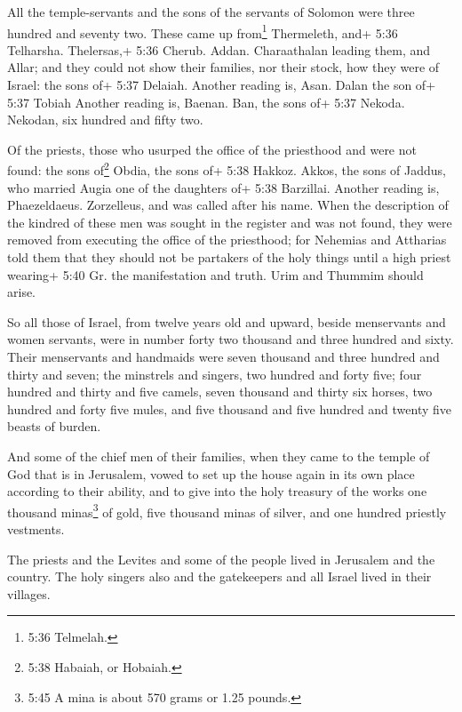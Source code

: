  All the temple-servants and the sons of the servants of
Solomon were three hundred and seventy two.  These came up
from\footnote{5:36 Telmelah.} Thermeleth, and+ 5:36 Telharsha.
Thelersas,+ 5:36 Cherub. Addan. Charaathalan leading them, and Allar;
 and they could not show their families, nor their stock,
how they were of Israel: the sons of+ 5:37 Delaiah. Another reading is,
Asan. Dalan the son of+ 5:37 Tobiah Another reading is, Baenan. Ban, the
sons of+ 5:37 Nekoda. Nekodan, six hundred and fifty two.

 Of the priests, those who usurped the office of the
priesthood and were not found: the sons of\footnote{5:38 Habaiah, or
  Hobaiah.} Obdia, the sons of+ 5:38 Hakkoz. Akkos, the sons of Jaddus,
who married Augia one of the daughters of+ 5:38 Barzillai. Another
reading is, Phaezeldaeus. Zorzelleus, and was called after his name.
 When the description of the kindred of these men was
sought in the register and was not found, they were removed from
executing the office of the priesthood;  for Nehemias and
Attharias told them that they should not be partakers of the holy things
until a high priest wearing+ 5:40 Gr. the manifestation and truth. Urim
and Thummim should arise.

 So all those of Israel, from twelve years old and upward,
beside menservants and women servants, were in number forty two thousand
and three hundred and sixty.  Their menservants and
handmaids were seven thousand and three hundred and thirty and seven;
the minstrels and singers, two hundred and forty five; 
four hundred and thirty and five camels, seven thousand and thirty six
horses, two hundred and forty five mules, and five thousand and five
hundred and twenty five beasts of burden.

 And some of the chief men of their families, when they
came to the temple of God that is in Jerusalem, vowed to set up the
house again in its own place according to their ability, 
and to give into the holy treasury of the works one thousand
minas\footnote{5:45 A mina is about 570 grams or 1.25 pounds.} of gold,
five thousand minas of silver, and one hundred priestly vestments.

 The priests and the Levites and some of the people lived
in Jerusalem and the country. The holy singers also and the gatekeepers
and all Israel lived in their villages.

